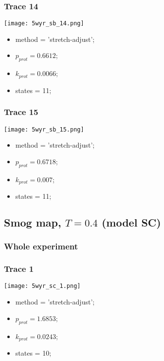 \subsubsection{Trace 14}
\begin{minipage}[c]{0.7\textwidth}
    \texttt{[image: 5wyr\_sb\_14.png]}
\end{minipage}
\hfill
\begin{minipage}[c]{0.45\textwidth}
    \begin{itemize}
        \item method = 'stretch-adjust';
        \item $p_{prot}=0.6612$;
        \item $k_{prot}=0.0066$;
        \item states = 11;
    \end{itemize}
\end{minipage}

\subsubsection{Trace 15}
\begin{minipage}[c]{0.7\textwidth}
    \texttt{[image: 5wyr\_sb\_15.png]}
\end{minipage}
\hfill
\begin{minipage}[c]{0.45\textwidth}
    \begin{itemize}
        \item method = 'stretch-adjust';
        \item $p_{prot}=0.6718$;
        \item $k_{prot}=0.007$;
        \item states = 11;
    \end{itemize}
\end{minipage}

\subsection{Smog map, $T=0.4$ (model SC)}
\subsubsection{Whole experiment}

\subsubsection{Trace 1}
\begin{minipage}[c]{0.7\textwidth}
    \texttt{[image: 5wyr\_sc\_1.png]}
\end{minipage}
\hfill
\begin{minipage}[c]{0.45\textwidth}
    \begin{itemize}
        \item method = 'stretch-adjust';
        \item $p_{prot}=1.6853$;
        \item $k_{prot}=0.0243$;
        \item states = 10;
    \end{itemize}
\end{minipage}

